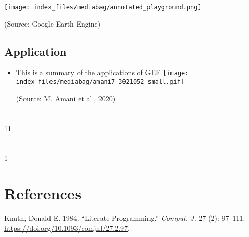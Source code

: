 \documentclass[
  letterpaper,
  DIV=11,
  numbers=noendperiod]{scrreprt}
\providecommand{\tightlist}{%
  \setlength{\itemsep}{0pt}\setlength{\parskip}{0pt}}\usepackage{longtable,booktabs,array}
\newlength{\cslhangindent}
\newlength{\cslentryspacingunit} %
\newenvironment{CSLReferences}[2] %
 {%
  \setlength{\parindent}{0pt}
  \ifodd #1
  \let\oldpar\par
  \def\par{\hangindent=\cslhangindent\oldpar}
  \fi
  \setlength{\parskip}{#2\cslentryspacingunit}
 }%
 {}
\begin{document}
\texttt{[image: index\_files/mediabag/annotated\_playground.png]}

(Source: Google Earth Engine)

\hypertarget{application-2}{%
\section{Application}\label{application-2}}

\begin{itemize}
\tightlist
\item
  This is a summary of the applications of GEE
  \texttt{[image: index\_files/mediabag/amani7-3021052-small.gif]}

  (Source: M. Amani et al., 2020)
\end{itemize}


\hypertarget{section}{%
\chapter{}\label{section}}

\href{/data/Monitoring_inland_water_bodies.gif}{11}


\hypertarget{section-1}{%
\chapter{}\label{section-1}}

1


\hypertarget{references}{%
\chapter*{References}\label{references}}


\hypertarget{refs}{}
\begin{CSLReferences}{1}{0}
\leavevmode{}%
Knuth, Donald E. 1984. {``Literate Programming.''} \emph{Comput. J.} 27
(2): 97--111. \url{https://doi.org/10.1093/comjnl/27.2.97}.

\end{CSLReferences}
\end{document}
